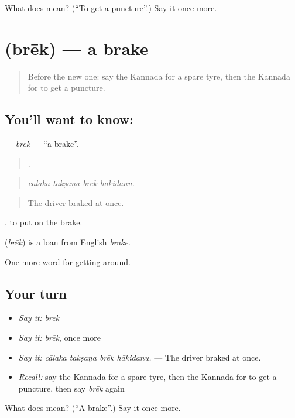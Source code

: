 \begin{tcolorbox}[breakable,colback=teal!4,colframe=teal!35!black,title={Before you move on}]
What does   mean? (\textquotedblleft{}To get a puncture\textquotedblright{}.) Say it once more.
\end{tcolorbox}
\section[\texorpdfstring{\kn{ಬ್ರೇಕ್} (brēk)}{ಬ್ರೇಕ್ (brēk)}]{ (brēk) — a brake}

\label{lesson:KA-C449-brek}



\begin{quote}
Before the new one: say the Kannada for a spare tyre, then the Kannada for to get a puncture.
\end{quote}

\subsection*{You'll want to know: }
\textbf{} — \emph{brēk} — \textquotedblleft{}a brake\textquotedblright{}.

\begin{quote}
   .
\end{quote}

\begin{quote}
\emph{cālaka takṣaṇa brēk hākidanu.}
\end{quote}

\begin{quote}
The driver braked at once.
\end{quote}

 , to put on the brake.

\begin{cousinweb}
\textbf{} (\emph{brēk}) is a loan from English \emph{brake}.
\end{cousinweb}

\begin{grammarlens}[title={What you've built}]
One more word for getting around.
\end{grammarlens}

\subsection*{Your turn}
\begin{itemize}
\raggedright
  \item \emph{Say it:} \emph{brēk}
  \item \emph{Say it:} \emph{brēk}, once more
  \item \emph{Say it:} \emph{cālaka takṣaṇa brēk hākidanu.} — The driver braked at once.
  \item \emph{Recall:} say the Kannada for a spare tyre, then the Kannada for to get a puncture, then say \emph{brēk} again
\end{itemize}

\begin{tcolorbox}[breakable,colback=teal!4,colframe=teal!35!black,title={Before you move on}]
What does  mean? (\textquotedblleft{}A brake\textquotedblright{}.) Say it once more.
\end{tcolorbox}
